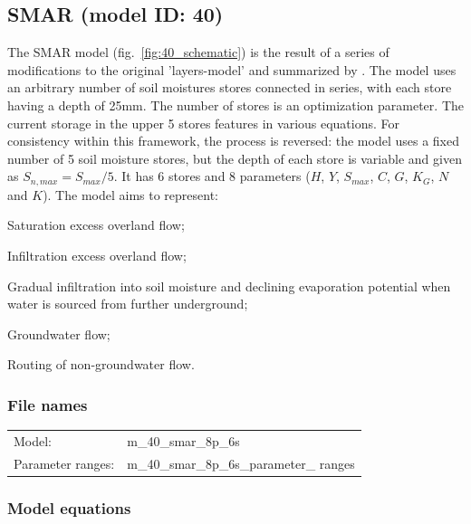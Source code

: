\subsection{SMAR (model ID: 40)}
The SMAR model (fig.~\ref{fig:40_schematic}) is the result of a series of modifications to the original 'layers-model' \citep{OConnell1970} and summarized by \citet{Tan1996}. The model uses an arbitrary number of soil moistures stores connected in series, with each store having a depth of 25mm. The number of stores is an optimization parameter. The current storage in the upper 5 stores features in various equations. For consistency within this framework, the process is reversed: the model uses a fixed number of 5 soil moisture stores, but the depth of each store is variable and given as $S_{n,max} = S_{max} / 5$. It has 6 stores and 8 parameters ($H$, $Y$, $S_{max}$, $C$, $G$, $K_G$, $N$ and $K$). The model aims to represent:

\begin{itemizecompact}
\item Saturation excess overland flow;
\item Infiltration excess overland flow;
\item Gradual infiltration into soil moisture and declining evaporation potential when water is sourced from further underground;
\item Groundwater flow;
\item Routing of non-groundwater flow.
\end{itemizecompact}

\subsubsection{File names}
\begin{tabular}{@{}ll}
Model: &m\_40\_smar\_8p\_6s \\
Parameter ranges: &m\_40\_smar\_8p\_6s\_parameter\_ ranges \\
\end{tabular}

\subsubsection{Model equations}

